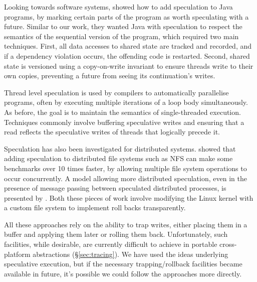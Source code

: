 Looking towards software systems, \citet{welc2005safe} showed how to add speculation to Java programs, by marking certain parts of the program as worth speculating with a future. Similar to our work, they wanted Java with speculation to respect the semantics of the sequential version of the program, which required two main techniques. First, all data accesses to shared state are tracked and recorded, and if a dependency violation occurs, the offending code is restarted.  Second, shared state is versioned using a copy-on-write invariant to ensure threads write to their own copies, preventing a future from seeing its continuation's writes.

Thread level speculation \cite{steffan1998potential} is used by compilers to automatically parallelise programs, often by executing multiple iterations of a loop body simultaneously. As before, the goal is to maintain the semantics of single-threaded execution. Techniques commonly involve buffering speculative writes \cite{steffan2000scalable} and ensuring that a read reflects the speculative writes of threads that logically precede it.

Speculation has also been investigated for distributed systems. \citet{nightingale2005speculative} showed that adding speculation to distributed file systems such as NFS can make some benchmarks over 10 times faster, by allowing multiple file system operations to occur concurrently. A model allowing more distributed speculation, even in the presence of message passing between speculated distributed processes, is presented by \citet{tapus2006distributed}. Both these pieces of work involve modifying the Linux kernel with a custom file system to implement roll backs transparently.

All these approaches rely on the ability to trap writes, either placing them in a buffer and applying them later or rolling them back. Unfortunately, such facilities, while desirable, are currently difficult to achieve in portable cross-platform abstractions (\S\ref{sec:tracing}). We have used the ideas underlying speculative execution, but if the necessary trapping/rollback facilities became available in future, it's possible we could follow the approaches more directly.
